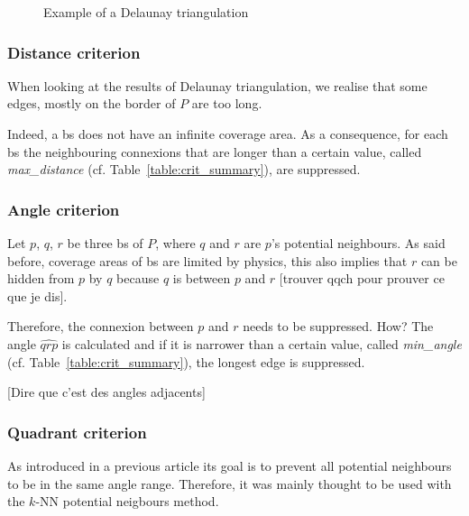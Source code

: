 \documentclass[lettersize,journal,english]{IEEEtran}
\begin{document}
\begin{figure}[!t]
    \centering
    \caption{Example of a Delaunay triangulation}
    \label{fig:crit_nei}
\end{figure}

\subsubsection{Distance criterion}
When looking at the results of Delaunay triangulation, we realise that some edges, mostly on the border of $P$ are too long.

Indeed, a \acrshort{bs} does not have an infinite coverage area. As a consequence, for each \acrshort{bs} the neighbouring connexions that are longer than a certain value, called \emph{max\_distance} (cf. Table~\ref{table:crit_summary}), are suppressed.

\subsubsection{Angle criterion}
Let $p$, $q$, $r$ be three \acrshort{bs} of $P$, where $q$ and $r$ are $p$'s potential neighbours. As said before, coverage areas of \acrshort{bs} are limited by physics, this also implies that $r$ can be \og hidden\fg{} from $p$ by $q$ because $q$ is between $p$ and $r$ [trouver qqch pour prouver ce que je dis].

Therefore, the connexion between $p$ and $r$ needs to be suppressed. How? The angle $\widehat{qrp}$ is calculated and if it is narrower than a certain value, called \emph{min\_angle} (cf. Table~\ref{table:crit_summary}), the longest edge is suppressed.

[Dire que c'est des angles adjacents]

\subsubsection{Quadrant criterion}
As introduced in a previous article \cite{10201211} its goal is to prevent all potential neighbours to be in the same angle range. Therefore, it was mainly thought to be used with the 
$k$-NN potential neigbours method.
\end{document}
